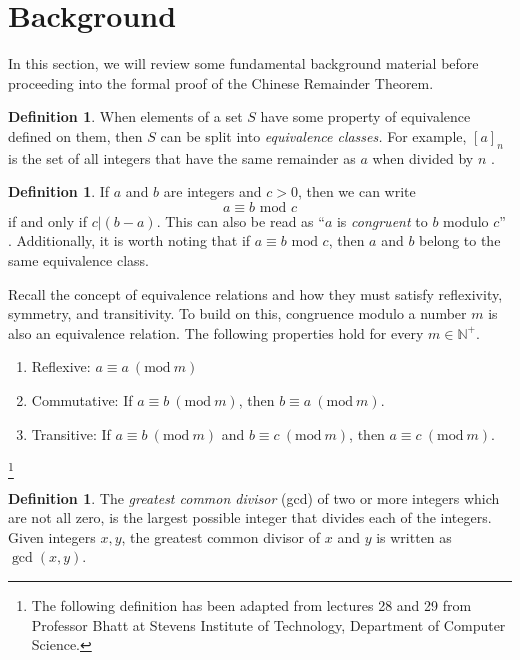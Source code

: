 \documentclass[12pt,a4paper,reqno,parskip=full]{amsart}
\numberwithin{equation}{section}
\theoremstyle{plain}
\theoremstyle{definition}
\newtheorem{definition}[subsection]{Definition}
\newcommand{\Mod}[1]{\ (\mathrm{mod}\ #1)}
\def\N{{\mathbb N}}
\begin{document}
\section{Background}
In this section, we will review some fundamental background material before proceeding into the formal proof of the Chinese Remainder Theorem.

\begin{definition}\label{equivalence-classes}
	When elements of a set $S$ have some property of equivalence defined on them, then $S$ can be split into \textit{equivalence classes.} For example, $[a]_n$ is the set of all integers that have the same remainder as $a$ when divided by $n$ \cite{Reluga}.
\end{definition}

\begin{definition}\label{congruent}
	If $a$ and $b$ are integers and $c > 0$, then we can write $$a \equiv b \text{ mod } c$$ if and only if $c | (b-a)$. This can also be read as ``$a$ is \textit{congruent} to $b$ modulo $c$'' \cite{Hausner}. Additionally, it is worth noting that if $a \equiv b \text{ mod } c$, then $a$ and $b$ belong to the same equivalence class.
\end{definition}

Recall the concept of equivalence relations and how they must satisfy reflexivity, symmetry, and transitivity. To build on this, congruence modulo a number $m$ is also an equivalence relation. The following properties hold for every $m \in \N^+$.
\begin{enumerate}
	\item Reflexive: $a \equiv a \Mod{m}$ 
	\item Commutative: If $a \equiv b \Mod{m}$, then $b \equiv a \Mod{m}$.
	\item Transitive: If $a \equiv b \Mod{m}$ and $b \equiv c \Mod{m}$, then $a \equiv c \Mod{m}$.
\end{enumerate}
\cite{sandeep}
\footnote{The following definition has been adapted from lectures 28 and 29 from Professor Bhatt at Stevens Institute of Technology, Department of Computer Science.\label{footnote:sandeep}}

\begin{definition}
	The \textit{greatest common divisor} (gcd) of two or more integers which are not all zero, is the largest possible integer that divides each of the integers. Given integers $x,y$, the greatest common divisor of $x$ and $y$ is written as $\gcd(x,y)$\cite{Long}.
\end{definition}
\end{document}
